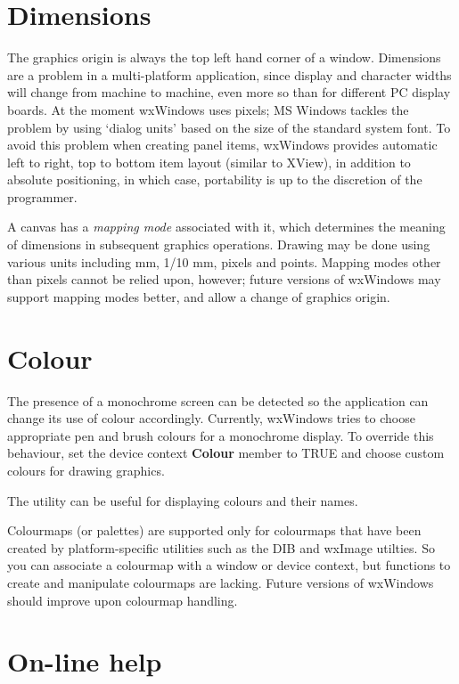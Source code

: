 \section{Dimensions}

The graphics origin is always the top left hand corner of a window.
Dimensions are a problem in a multi-platform application, since display
and character widths will change from machine to machine, even more so
than for different PC display boards. At the moment wxWindows uses
pixels; MS Windows tackles the problem by using `dialog units' based on
the size of the standard system font.  To avoid this problem when
creating panel items, wxWindows provides automatic left to right, top to
bottom item layout (similar to XView), in addition to absolute
positioning, in which case, portability is up to the discretion of the
programmer.

A canvas has a {\it mapping mode}\/ associated with it, which determines
the meaning of dimensions in subsequent graphics operations. Drawing may
be done using various units including mm, 1/10 mm, pixels and points.
Mapping modes other than pixels cannot be relied upon, however; future
versions of wxWindows may support mapping modes better, and allow a
change of graphics origin.

\section{Colour}

The presence of a monochrome screen can be detected so the application
can change its use of colour accordingly. Currently, wxWindows tries to
choose appropriate pen and brush colours for a monochrome display. To
override this behaviour, set the device context {\bf Colour} member to
TRUE and choose custom colours for drawing graphics.

The  utility can be useful for displaying
colours and their names.

Colourmaps (or palettes) are supported only for colourmaps that have
been created by platform-specific utilities such as the DIB and wxImage
utilties. So you can associate a colourmap with a window or device
context, but functions to create and manipulate colourmaps are lacking.
Future versions of wxWindows should improve upon colourmap handling.

\section{On-line help}


